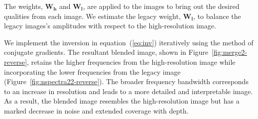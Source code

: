 The weights, $\mathbf{W_h}$ and $\mathbf{W_l}$, are applied to the images to bring out the desired qualities 
from each image. We estimate the legacy weight, $\mathbf{W_l}$, to balance the legacy images's amplitudes with respect to the high-resolution image.


We implement the inversion in equation~(\ref{eq:inv}) iteratively
using the method of conjugate gradients. The resultant blended image,
shown in Figure~\ref{fig:merge2-reverse}, retains the higher
frequencies from the high-resolution image while incorporating the
lower frequencies from the legacy image
(Figure~\ref{fig:nspectra22-reverse}). The broader frequency bandwidth
corresponds to an increase in resolution and leads to a more detailed
and interpretable image.  As a result, the blended image resembles the
high-resolution image but has a marked decrease in noise and extended
coverage with depth. 


